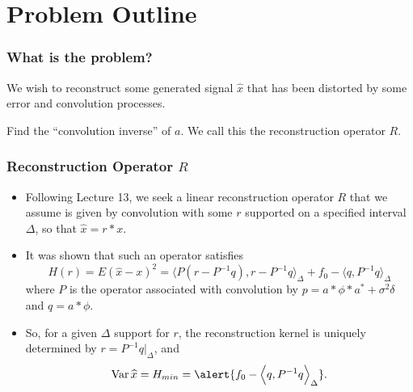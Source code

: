 \documentclass[t]{beamer}
\begin{document}
\section{Problem Outline}
\begin{frame}
\frametitle{What is the problem?}
 We wish to reconstruct some generated signal $\hat{x}$ that has been distorted by some error and convolution processes. \newline \vspace{.5cm}

 Find the ``convolution inverse'' of $a$. We call this the reconstruction operator $R$.
\end{frame}
\begin{frame}
  \frametitle{Reconstruction Operator $R$}  
  \begin{itemize}
    \item Following Lecture 13, we seek a linear reconstruction operator $R$ that we assume is given by convolution with some $r$ supported on a specified interval $\Delta$, so that $\widehat x = r*x$.
    \item It was shown that such an operator satisfies
    $$
      H(r) = E( \widehat x - x )^2 = \Big\langle P (r - P^{-1}q), r- P^{-1}q \Big\rangle_{\Delta} + f_0 - \Big\langle q, P^{-1}q\Big\rangle_{\Delta}
    $$
    where $P$ is the operator associated with convolution by $p = a*\phi*a^* + \sigma^2\delta$ and $q = a*\phi$.
    \item So, for a given $\Delta$ support for $r$, the reconstruction kernel is uniquely determined by \alert{$r = P^{-1}q|_\Delta$}, and 
    $$
    \mathrm{Var}\, \widehat x = H_{min} = \alert{f_0 - \Big\langle q, P^{-1}q\Big\rangle_{\Delta}}.
    $$
  \end{itemize}
\end{frame}
\end{document}
